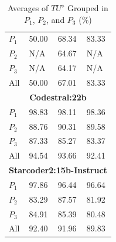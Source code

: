 \begin{table}
\begin{tabularx}{\textwidth}{l X X X}
\midrule
$P_1$ 
& 50.00 
& 68.34
& 83.33\\
$P_2$ 
& N/A 
& 64.67
& N/A\\
$P_3$ 
& N/A
& 64.17
& N/A\\
All 
& 50.00 
& 67.01
& 83.33\\
\midrule
\multicolumn{4}{c}{\small\textbf{Codestral:22b}} \\
\midrule
$P_1$ 
& 98.83
& 98.11
& 98.36\\
$P_2$ 
& 88.76
& 90.31
& 89.58\\
$P_3$ 
& 87.33
& 85.27
& 83.37\\
All 
& 94.54
& 93.66
& 92.41\\
\midrule
\multicolumn{4}{c}{\small\textbf{Starcoder2:15b-Instruct}} \\
\midrule
$P_1$ 
& 97.86 
& 96.44 
& 96.64\\
$P_2$ 
& 83.29 
& 87.57 
& 81.92\\
$P_3$ 
& 84.91 
& 85.39
& 80.48\\
All 
& 92.40
& 91.96 
& 89.83\\
\bottomrule
\end{tabularx}
\caption{Averages of $TU^\diamond$ Grouped in $P_1$, $P_2$, and $P_3$ (\%)}
\label{tab:fgi_tu}
\end{table}